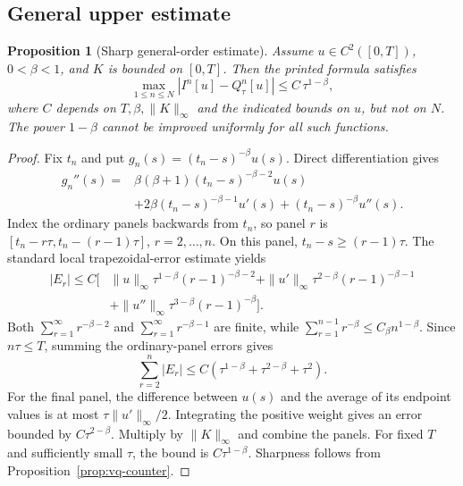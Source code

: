 \documentclass[11pt,a4paper]{amsart}
\theoremstyle{remark}
\theoremstyle{plain}
\newtheorem{proposition}{Proposition}[section]
\theoremstyle{remark}
\numberwithin{equation}{section}
\begin{document}
\subsection{General upper estimate}
\begin{proposition}[Sharp general-order estimate]\label{prop:vq-upper}
Assume $u\in C^2([0,T])$, $0<\beta<1$, and $K$ is bounded on $[0,T]$. Then the printed formula satisfies
\[
 \max_{1\le n\le N}|I^n[u]-Q_\tau^n[u]|
 \le C\,\tau^{1-\beta},
\]
where $C$ depends on $T,\beta,\|K\|_\infty$ and the indicated bounds on $u$, but not on $N$. The power $1-\beta$ cannot be improved uniformly for all such functions.
\end{proposition}
\begin{proof}
Fix $t_n$ and put $g_n(s)=(t_n-s)^{-\beta}u(s)$. Direct differentiation gives
\begin{equation}\label{eq:vq-curvature}
\begin{aligned}
 g_n''(s)={}&\beta(\beta+1)(t_n-s)^{-\beta-2}u(s)\\
 &+2\beta(t_n-s)^{-\beta-1}u'(s)
 +(t_n-s)^{-\beta}u''(s).
\end{aligned}
\end{equation}
Index the ordinary panels backwards from $t_n$, so panel $r$ is
$[t_n-r\tau,t_n-(r-1)\tau]$, $r=2,\ldots,n$.
On this panel, $t_n-s\ge(r-1)\tau$. The standard local trapezoidal-error estimate yields
\begin{equation*}
\begin{aligned}
 |E_r|\le C\bigl[&\|u\|_\infty\tau^{1-\beta}(r-1)^{-\beta-2}
 +\|u'\|_\infty\tau^{2-\beta}(r-1)^{-\beta-1}\\
 &+\|u''\|_\infty\tau^{3-\beta}(r-1)^{-\beta}\bigr].
\end{aligned}
\end{equation*}
Both $\sum_{r=1}^\infty r^{-\beta-2}$ and
$\sum_{r=1}^\infty r^{-\beta-1}$ are finite, while
$\sum_{r=1}^{n-1}r^{-\beta}\le C_\beta n^{1-\beta}$.
Since $n\tau\le T$, summing the ordinary-panel errors gives
\[
 \sum_{r=2}^n|E_r|
 \le C(\tau^{1-\beta}+\tau^{2-\beta}+\tau^2).
\]
For the final panel, the difference between $u(s)$ and the average of its endpoint values is at most $\tau\|u'\|_\infty/2$. Integrating the positive weight gives an error bounded by
$C\tau^{2-\beta}$. Multiply by $\|K\|_\infty$ and combine the panels. For fixed $T$ and sufficiently small $\tau$, the bound is $C\tau^{1-\beta}$. Sharpness follows from Proposition~\ref{prop:vq-counter}.
\end{proof}
\end{document}
